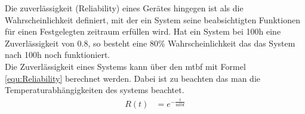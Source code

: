Die zuverlässigkeit (Reliability) eines Gerätes hingegen ist als die Wahrscheinlichkeit definiert, mit der ein System seine beabsichtigten Funktionen für einen Festgelegten zeitraum erfüllen wird. Hat ein System bei 100h eine Zuverlässigkeit von 0.8, so besteht eine 80\% Wahrscheinlichkeit das das System nach 100h noch funktioniert.\cite{MTBFReliability}\\
Die Zuverlässigkeit eines Systems kann über den \ac{mtbf} mit Formel \ref{equ:Reliability} berechnet werden. Dabei ist zu beachten das man die Temperaturabhängigkeiten des systems beachtet.
\begin{align}
    && R(t) &= e^{-\frac{t}{\text{mtbf}}} &&
    \label{equ:Reliability} 
\end{align}
